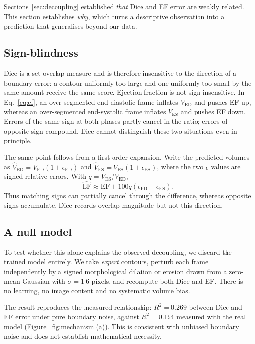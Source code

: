 \documentclass[conference,a4paper]{IEEEtran}
\begin{document}
Sections~\ref{sec:decoupling} established \emph{that} Dice and EF error are weakly related.
This section establishes \emph{why}, which turns a descriptive observation into a
prediction that generalises beyond our data.

\subsection{Sign-blindness}
Dice is a set-overlap measure and is therefore insensitive to the direction of a boundary
error: a contour uniformly too large and one uniformly too small by the same amount receive
the same score. Ejection fraction is not sign-insensitive. In Eq.~\eqref{eq:ef}, an
over-segmented end-diastolic frame inflates $V_{\mathrm{ED}}$ and pushes EF up, whereas an
over-segmented end-systolic frame inflates $V_{\mathrm{ES}}$ and pushes EF down. Errors of
the same sign at both phases partly cancel in the ratio; errors of opposite sign compound.
Dice cannot distinguish these two situations even in principle.

The same point follows from a first-order expansion. Write the predicted volumes as
$\widehat{V}_{\mathrm{ED}}=V_{\mathrm{ED}}(1+\epsilon_{\mathrm{ED}})$ and
$\widehat{V}_{\mathrm{ES}}=V_{\mathrm{ES}}(1+\epsilon_{\mathrm{ES}})$, where the two
$\epsilon$ values are signed relative errors. With $q=V_{\mathrm{ES}}/V_{\mathrm{ED}}$,
\begin{equation}
\widehat{\mathrm{EF}}
\approx \mathrm{EF}+100q(\epsilon_{\mathrm{ED}}-\epsilon_{\mathrm{ES}}).
\label{eq:first_order}
\end{equation}
Thus matching signs can partially cancel through the difference, whereas opposite signs
accumulate. Dice records overlap magnitude but not this direction.

\subsection{A null model}
To test whether this alone explains the observed decoupling, we discard the trained model
entirely. We take \emph{expert} contours, perturb each frame independently by a signed
morphological dilation or erosion drawn from a zero-mean Gaussian with $\sigma=1.6$ pixels,
and recompute both Dice and EF. There is no learning, no image content and no systematic
volume bias.

The result reproduces the measured relationship: $R^2 = 0.269$ between Dice and EF error
under pure boundary noise, against $R^2 = 0.194$ measured with the real model
(Figure~\ref{fig:mechanism}(a)). This is consistent with unbiased boundary noise and does
not establish mathematical necessity.
\end{document}
